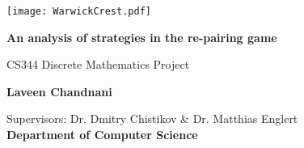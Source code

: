 \thispagestyle{empty}

\vspace*{\fill}
\begin{spacing}{2}
    \begin{center}
        \texttt{[image: WarwickCrest.pdf]}
    \end{center}
    \vspace{5mm}
    \begin{center}
        \textbf{\LARGE An analysis of strategies in the re-pairing game}
  
		\vspace{5mm}
	\end{center}
	\begin{center}
		{\large CS344 Discrete Mathematics Project}\\
	\end{center}
	\begin{center}
        \vspace{20mm}
		\textbf{\large Laveen Chandnani}
		\vspace{20mm}
	\end{center}
	\begin{center}
	     {\large Supervisors: Dr. Dmitry Chistikov \& Dr. Matthias Englert }\\
		\textbf{\large Department of Computer Science}\\
	\end{center}
    
\end{spacing}
\vspace*{\fill}
